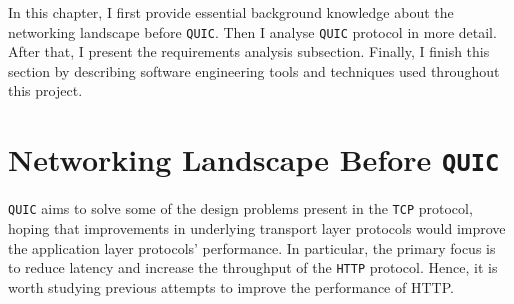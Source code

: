 \documentclass[12pt,a4paper,twoside,openright]{report}
\begin{document}











In this chapter, I first provide essential background knowledge about the networking landscape before \texttt{QUIC}. 
Then I analyse \texttt{QUIC} protocol in more detail.
After that, I present the requirements analysis subsection.
Finally, I finish this section by describing software engineering tools and techniques used throughout this project.


\section{Networking Landscape Before \texttt{QUIC}}
    \texttt{QUIC} aims to solve some of the design problems present in the \texttt{TCP} protocol, hoping that improvements in underlying transport layer protocols would improve the application layer protocols' performance.
    In particular, the primary focus is to reduce latency and increase the throughput of the \texttt{HTTP} protocol.
    Hence, it is worth studying previous attempts to improve the performance of HTTP.
\end{document}
